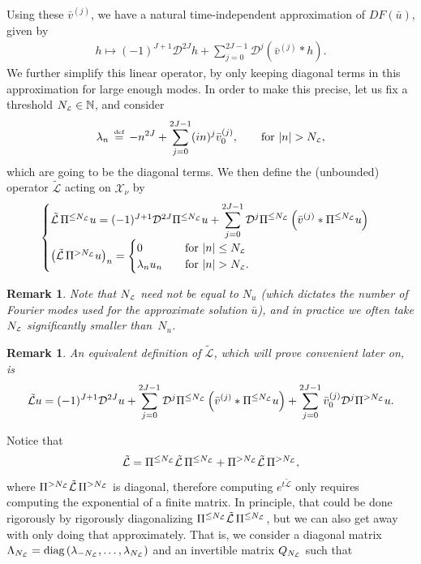 \documentclass[10pt,a4paper]{article}
\theoremstyle{plain}
\newtheorem{remark}[theorem]{Remark}
\newcommand{\NN}{\mathbb N}
\renewcommand{\L}{\mathcal{L}}
\newcommand{\tL}{\tilde{\mathcal{L}}}
\newcommand{\D}{\mathcal{D}}
\newcommand{\X}{\mathcal{X}}
\newcommand{\bu}{\bar{u}}
\newcommand{\bv}{\bar{v}}
\newcommand{\1}{\mathbf{1}}
\newcommand{\ds}{\displaystyle}
\newcommand{\bydef}{\,\stackrel{\mbox{\tiny\textnormal{\raisebox{0ex}[0ex][0ex]{def}}}}{=}\,}
\newcommand{\Nu}{N_{u}}
\newcommand{\NL}{N_{\text{\tiny{$\L$}}}}
\begin{document}
Using these $\bv^{(j)}$, we have a natural time-independent approximation of $DF(\bu)$, given by
\begin{align*}
h \mapsto (-1)^{J+1} \D^{2J}h + \displaystyle\sum_{j=0}^{2J-1} \D^{j}\left(\bv^{(j)}\ast h\right).
\end{align*}
We further simplify this linear operator, by only keeping diagonal terms in this approximation for large enough modes.
In order to make this precise, let us fix a threshold $\NL\in\NN$, and consider
\begin{align}
\label{eq:deflambda}
\lambda_n \bydef -n^{2J} + \sum_{j=0}^{2J-1} (in)^j \bv^{(j)}_0,\qquad \text{for }\vert n\vert > \NL,
\end{align}
which are going to be the diagonal terms. We then define the (unbounded) operator $\tL$ acting on $\X_\nu$ by
\begin{align*}
\begin{cases}
\tL \,\Pi^{\leq \NL}u = (-1)^{J+1} \D^{2J} \Pi^{\leq \NL}u + \ds \sum_{j=0}^{2J-1} \D^{j} \Pi^{\leq \NL}\left( \bv^{(j)} \ast \Pi^{\leq \NL}u \right) \\
\left(\tL \,\Pi^{> \NL}u\right)_{n} = 
\begin{cases}
	0 & \quad \text{for } \vert n\vert \leq \NL\\
	\lambda_n u_n &\quad \text{for } \vert n\vert > \NL.
\end{cases}
\end{cases}
\end{align*}
%
\begin{remark}
Note that $\NL$ need not be equal to $\Nu$ (which dictates the number of Fourier modes used for the approximate solution $\bu$), and in practice we often take $\NL$ significantly smaller than~$\Nu$.
\end{remark}
%
\begin{remark}
An equivalent definition of $\tL$, which will prove convenient later on, is
\begin{align}
\label{eq:deftL}
\tL u = (-1)^{J+1} \D^{2J}u + \ds \sum_{j=0}^{2J-1} \D^{j} \Pi^{\leq \NL}\left( \bv^{(j)} \ast \Pi^{\leq \NL}u \right) + \sum_{j=0}^{2J-1} \bv^{(j)}_0 \D^{j} \Pi^{> \NL}u .
\end{align}
\end{remark}
%
Notice that
\begin{align*}
\tL = \Pi^{\leq \NL} \tL \,\Pi^{\leq \NL} + \Pi^{> \NL} \tL \,\Pi^{> \NL},
\end{align*}
where $\Pi^{> \NL} \tL \,\Pi^{> \NL}$ is diagonal, therefore computing $e^{t\tL}$ only requires computing the exponential of a finite matrix. In principle, that could be done rigorously by rigorously diagonalizing $\Pi^{\leq \NL} \tL \,\Pi^{\leq \NL}$, but we can also get away with only doing that approximately. That is, we consider a diagonal matrix $\Lambda_{\NL}= \text{diag}\left(\lambda_{-\NL},\ldots,\lambda_{\NL}\right)$ and an invertible matrix $Q_{\NL}$ such that
\end{document}
